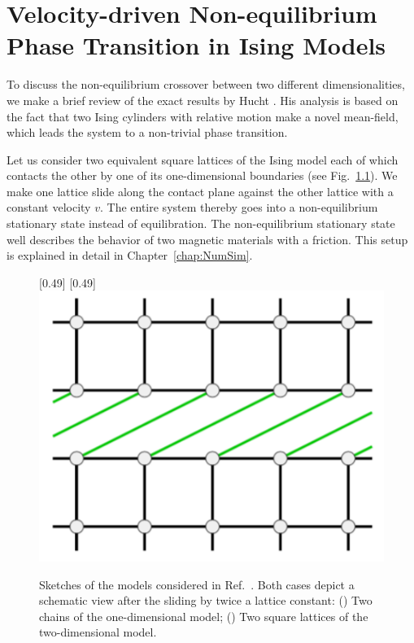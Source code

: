 
\chapter{Velocity-driven Non-equilibrium Phase Transition in Ising Models}\label{ch:review}

To discuss the non-equilibrium crossover between two different dimensionalities, we make a brief review of the exact results by Hucht \cite{Hucht2009b}. His analysis is based on the fact that two Ising cylinders with relative motion make a novel mean-field, which leads the system to a non-trivial phase transition.

Let us consider two equivalent square lattices of the Ising model each of which contacts the other by one of its one-dimensional boundaries (see Fig.~\ref{fig:SketchNEIsing}). We make one lattice slide along the contact plane against the other lattice with a constant velocity $v$. The entire system thereby goes into a non-equilibrium stationary state instead of equilibration. The non-equilibrium stationary state well describes the behavior of two magnetic materials with a friction. This setup is explained in detail in Chapter~\ref{chap:NumSim}.

\begin{figure}[htbp]
	\centering
	\subcaptionbox{\label{subcap:one-dim}}[0.49\linewidth]{}
	\subcaptionbox{\label{subcap:two-dim}}[0.49\linewidth]{\includegraphics[width=0.35\linewidth]{Fig3Modified.pdf}}
	\caption{Sketches of the models considered in Ref.~\cite{Hucht2009b}\protect\footnotemark. Both cases depict a schematic view after the sliding by twice a lattice constant: () Two chains of the one-dimensional model; () Two square lattices of the two-dimensional model.}
	\label{fig:SketchNEIsing}
\end{figure}

